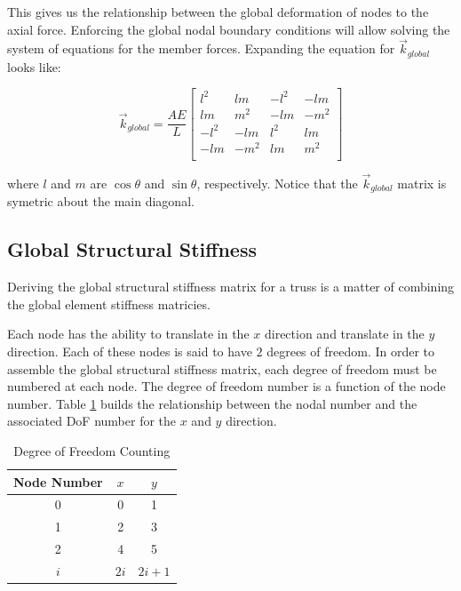 This gives us the relationship between the global deformation of nodes to the axial force. Enforcing the global nodal boundary conditions will allow solving the system of equations for the member forces. Expanding the equation for $\vec{k}_{global}$ looks like:

\begin{equation}
\vec{k}_{global}
=
\frac{AE}{L}
	\begin{bmatrix}
  	l^2 & lm & -l^2 & -lm\\
  	lm & m^2 & -lm & -m^2\\
  	-l^2 & -lm & l^2 & lm\\
  	-lm & -m^2 & lm & m^2\\
	\end{bmatrix}
\end{equation}

where $l$ and $m$ are $\cos\theta$ and $\sin\theta$, respectively.
Notice that the $\vec{k}_{global}$ matrix is  symetric about the main diagonal.



\subsection{Global Structural Stiffness}

Deriving the global structural stiffness matrix for a truss is a matter of combining the global element stiffness matricies.

Each node has the ability to translate in the $x$ direction and translate in the $y$ direction. Each of these nodes is said to have $2$ degrees of freedom. In order to assemble the global structural stiffness matrix, each degree of freedom must be numbered at each node. The degree of freedom number is a function of the node number. Table \ref{Tab:TrussDoFCount} builds the relationship between the nodal number and the associated DoF number for the $x$ and $y$ direction.

\begin{table}[h]
\centering
\caption{Degree of Freedom Counting}
\label{Tab:TrussDoFCount}
\begin{tabular}{|c|c|c|}
\hline
Node Number & $x$ & $y$ \\ \hline
0 & 0 & 1 \\ \hline
1 & 2 & 3 \\ \hline
2 & 4 & 5 \\ \hline
$i$ & $2i$ & $2i+1$ \\ \hline
\end{tabular}
\end{table}


